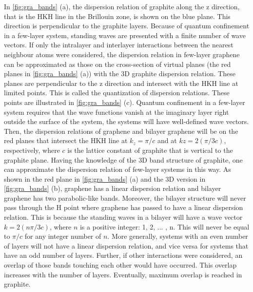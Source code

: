In \autoref{fig:gra_bands} (a), the dispersion relation of graphite along the z direction, that is the HKH line in the Brillouin zone, is shown on the blue plane. This direction is perpendicular to the graphite layers. Because of quantum confinement in a few-layer system,  standing waves are presented with a finite number of wave vectors.  If only the intralayer and interlayer interactions between the nearest neighbour atoms were considered, the dispersion relation in few-layer graphene can be approximated as those on the cross-section of virtual planes (the red planes in \autoref{fig:gra_bands} (a)) with the 3D graphite dispersion relation.  These planes are perpendicular to the z direction and intersect with the HKH line at limited points. This is called the quantization\footnotemark{} of dispersion relations\cite{saito1998physical}. These points are illustrated in \autoref{fig:gra_bands} (c). Quantum confinement in a few-layer system requires that the wave functions vanish at the imaginary layer right outside the surface of the system, the systems will have well-defined wave vectors. Then, the dispersion relations of graphene and bilayer graphene will be on the red planes that intersect the HKH line at $k_z=\pi/c$ and at $kz=2(\pi/3c)$, respectively, where $c$ is the lattice constant of graphite that is vertical to the graphite plane.  Having the knowledge of the 3D band structure of graphite, one can approximate the dispersion relation of few-layer systems in this way. As shown in the red plane in \autoref{fig:gra_bands} (a) and the 3D version in \autoref{fig:gra_bands} (b), graphene has a linear dispersion relation and bilayer graphene has two parabolic-like bands. Moreover, the bilayer structure will never pass through the H point where graphene has passed to have a linear dispersion relation. This is because the standing waves in a bilayer will have a wave vector $k=2(n \pi/3c)$, where $n$ is a positive integer: 1, 2, ... , n. This will never be equal to $\pi/c$ for any integer number of $n$. More generally, systems with an even number of layers will not have a linear dispersion relation, and vice versa for systems that have an odd number of layers. Further, if other interactions were considered, an overlap of those bands touching each other would have occurred\cite{Partoens2006}. This overlap increases with the number of layers. Eventually, maximum overlap is reached in graphite.


